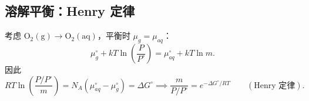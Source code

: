 \subsection{溶解平衡：Henry 定律}
考虑 $\mathrm{O_2(g)}\to \mathrm{O_2(aq)}$，平衡时 $\mu_g=\mu_{aq}$：
\begin{equation}
    \mu_g^\circ+kT\ln\left(\frac{P}{P^\circ}\right)=\mu_{aq}^\circ+kT\ln m.
\end{equation}
因此
\begin{equation}
    RT\ln\left(\frac{P/P^\circ}{m}\right)=N_A(\mu_{aq}^\circ-\mu_g^\circ)=\Delta G^\circ
    \implies \frac{m}{P/P^\circ}=e^{-\Delta G^\circ/RT}\qquad (\text{Henry 定律}).
\end{equation}
